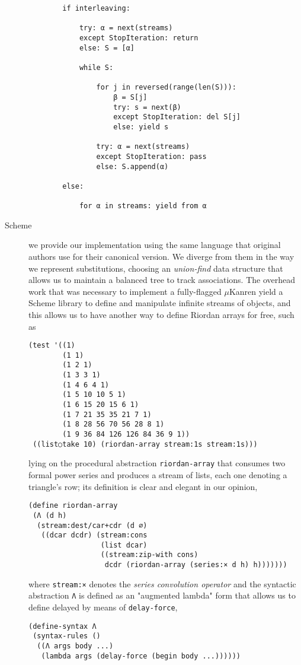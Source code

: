 \begin{description}
\begin{verbatim}
        if interleaving:

            try: α = next(streams)
            except StopIteration: return
            else: S = [α]

            while S:

                for j in reversed(range(len(S))):
                    β = S[j]
                    try: s = next(β)
                    except StopIteration: del S[j]
                    else: yield s

                try: α = next(streams)
                except StopIteration: pass
                else: S.append(α)

        else:

            for α in streams: yield from α
    \end{verbatim}

\item[Scheme] we provide our implementation using the same language that
original authors use for their canonical version. We diverge from them in the
way we represent substitutions, choosing an \textit{union-find}  data structure
that allows us to maintain a balanced tree to track associations.
The overhead work that was necessary to implement a fully-flagged
$\mu$Kanren yield a Scheme library to define and manipulate infinite streams of
objects, and this allows us to have another way to define Riordan arrays for free, such as
\begin{verbatim}
(test '((1)
        (1 1)
        (1 2 1)
        (1 3 3 1)
        (1 4 6 4 1)
        (1 5 10 10 5 1)
        (1 6 15 20 15 6 1)
        (1 7 21 35 35 21 7 1)
        (1 8 28 56 70 56 28 8 1)
        (1 9 36 84 126 126 84 36 9 1))
 ((list○take 10) (riordan-array stream:1s stream:1s)))
\end{verbatim}
lying on the procedural abstraction \verb|riordan-array| that consumes two
formal power series and produces a stream of lists, each one denoting a
triangle's row; its definition is clear and elegant in our opinion,
\begin{verbatim}
(define riordan-array
 (Λ (d h)
  (stream:dest/car+cdr (d ∅)
   ((dcar dcdr) (stream:cons
                 (list dcar)
                 ((stream:zip-with cons)
                  dcdr (riordan-array (series:× d h) h)))))))
\end{verbatim}
where \verb|stream:×| denotes the \textit{series convolution operator} and
the syntactic abstraction \verb|Λ| is defined as an "augmented lambda" form
that allows us to define delayed by means of \verb|delay-force|,
\begin{verbatim}
(define-syntax Λ
 (syntax-rules ()
  ((Λ args body ...)
   (lambda args (delay-force (begin body ...))))))
\end{verbatim}


\end{description}
